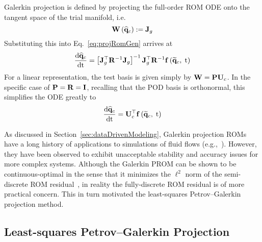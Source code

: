 Galerkin projection is defined by projecting the full-order ROM ODE onto the tangent space of the trial manifold, i.e.
%
\begin{equation}
    \testBasis\left(\consVecCoef\right) \defEq \jacobDecode
\end{equation}
%
Substituting this into Eq.~\ref{eq:projRomGen} arrives at
%
\begin{equation}
    \ode{\consVecCoef}{\timeVar} = \left[\jacobDecode^\top \resScaleInv \jacobDecode\right]^{-1} \jacobDecode^\top \resScaleInv \rhsFunc{\consVecRom, \; \timeVar}
\end{equation}
%
For a linear representation, the test basis is given simply by $\testBasis = \consScale \consTrial$. In the specific case of $\consScale = \resScale = \identMat$, recalling that the POD basis is orthonormal, this simplifies the ODE greatly to
%
\begin{equation}
    \ode{\consVecCoef}{\timeVar} = \consTrial^\top \rhsFunc{\consVecRom, \; \timeVar}
\end{equation} 

As discussed in Section~\ref{sec:dataDrivenModeling}, Galerkin projection ROMs have a long history of applications to simulations of fluid flows (e.g.,~\cite{Aubry1988,Cazemier1998,BuiThanh2007}). However, they have been observed to exhibit unacceptable stability and accuracy issues for more complex systems. Although the Galerkin PROM can be shown to be continuous-optimal in the sense that it minimizes the $\ell^2$ norm of the semi-discrete ROM residual~\cite{Carlberg2017}, in reality the fully-discrete ROM residual is of more practical concern. This in turn motivated the least-squares Petrov--Galerkin projection method.

\subsection{Least-squares Petrov--Galerkin Projection}

